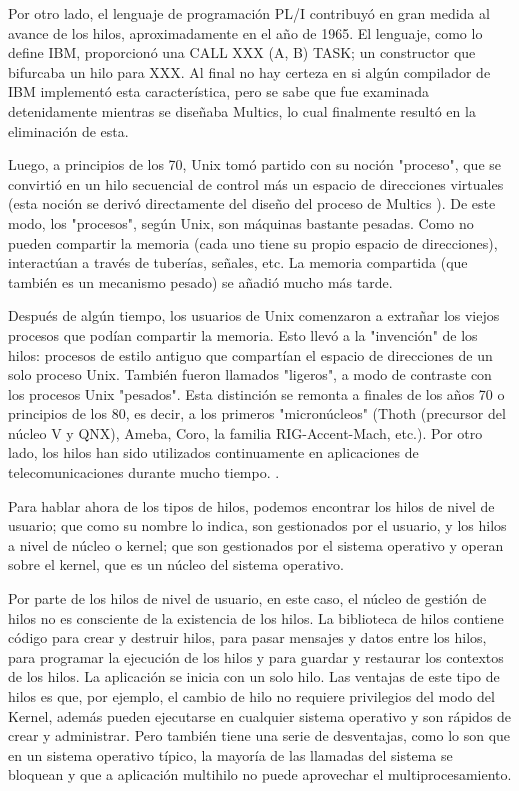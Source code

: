 \documentclass[12pt]{article}
\begin{document}
{Por otro lado, el lenguaje de programación PL/I contribuyó en gran medida al avance de los hilos, aproximadamente en el año de 1965. El lenguaje, como lo define IBM, proporcionó una CALL XXX (A, B) TASK; un constructor que bifurcaba un hilo para XXX. Al final no hay certeza en si algún compilador de IBM implementó esta característica, pero se sabe que fue examinada detenidamente mientras se diseñaba Multics, lo cual finalmente resultó en la eliminación de esta.
\newline

Luego, a principios de los 70, Unix tomó partido con su noción "proceso", que se convirtió en un hilo secuencial de control más un espacio de direcciones virtuales (esta noción se derivó directamente del diseño del proceso de Multics ). De este modo, los "procesos", según Unix, son máquinas bastante pesadas. Como no pueden compartir la memoria (cada uno tiene su propio espacio de direcciones), interactúan a través de tuberías, señales, etc. La memoria compartida (que también es un mecanismo pesado) se añadió mucho más tarde.
\newline

Después de algún tiempo, los usuarios de Unix comenzaron a extrañar los viejos procesos que podían compartir la memoria. Esto llevó a la "invención" de los hilos: procesos de estilo antiguo que compartían el espacio de direcciones de un solo proceso Unix. También fueron llamados "ligeros", a modo de contraste con los procesos Unix "pesados". Esta distinción se remonta a finales de los años 70 o principios de los 80, es decir, a los primeros "micronúcleos" (Thoth (precursor del núcleo V y QNX), Ameba, Coro, la familia RIG-Accent-Mach, etc.).
Por otro lado, los hilos han sido utilizados continuamente en aplicaciones de telecomunicaciones durante mucho tiempo.
\citep{Hist}.
\newline

Para hablar ahora de los tipos de hilos, podemos encontrar los hilos de nivel de usuario; que como su nombre lo indica, son gestionados por el usuario, y los hilos a nivel de núcleo o kernel; que son gestionados por el sistema operativo y operan sobre el kernel, que es un núcleo del sistema operativo.
\newline

Por parte de los hilos de nivel de usuario, en este caso, el núcleo de gestión de hilos no es consciente de la existencia de los hilos. La biblioteca de hilos contiene código para crear y destruir hilos, para pasar mensajes y datos entre los hilos, para programar la ejecución de los hilos y para guardar y restaurar los contextos de los hilos. La aplicación se inicia con un solo hilo. Las ventajas de este tipo de hilos es que, por ejemplo, el cambio de hilo no requiere privilegios del modo del Kernel, además pueden ejecutarse en cualquier sistema operativo y son rápidos de crear y administrar. Pero también tiene una serie de desventajas, como lo son que en un sistema operativo típico, la mayoría de las llamadas del sistema se bloquean y que a aplicación multihilo no puede aprovechar el multiprocesamiento.
\newline

}
\end{document}
